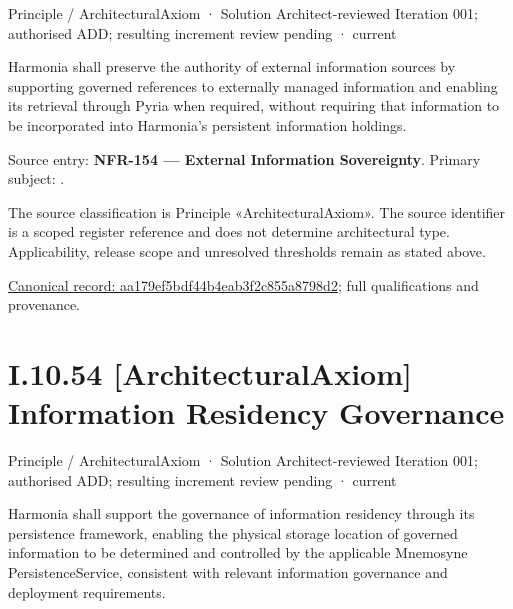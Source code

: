\label{element:aa179ef5bdf44b4eab3f2c855a8798d2}
{\small Principle / ArchitecturalAxiom · Solution Architect-reviewed Iteration 001; authorised ADD; resulting increment review pending · current}\par

Harmonia shall preserve the authority of external information sources by supporting governed references to externally managed information and enabling its retrieval through Pyria when required, without requiring that information to be incorporated into Harmonia's persistent information holdings.



Source entry: \textbf{NFR-154 — External Information Sovereignty}. Primary subject: \texttt{}.



The source classification is Principle «ArchitecturalAxiom». The source identifier is a scoped register reference and does not determine architectural type. Applicability, release scope and unresolved thresholds remain as stated above.


{\footnotesize \href{../../../../../../../continuum/motivation/principle/architectural-axiom/aa179ef5bdf44b4eab3f2c855a8798d2.md}{Canonical record: aa179ef5bdf44b4eab3f2c855a8798d2}; full qualifications and provenance.}\par
\section*{I.10.54 [ArchitecturalAxiom] Information Residency Governance}
\label{navigation:I.10.54}

\label{element:349f526a401e4e299b854cbfedad0fca}
{\small Principle / ArchitecturalAxiom · Solution Architect-reviewed Iteration 001; authorised ADD; resulting increment review pending · current}\par

Harmonia shall support the governance of information residency through its persistence framework, enabling the physical storage location of governed information to be determined and controlled by the applicable Mnemosyne PersistenceService, consistent with relevant information governance and deployment requirements.



